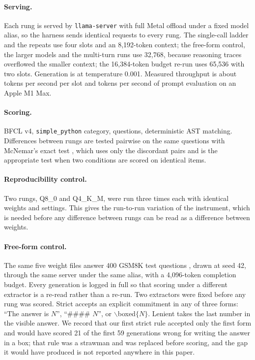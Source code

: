 \documentclass[11pt]{article}
\newcommand{\bfcl}{BFCL}
\begin{document}
\paragraph{Serving.} Each rung is served by \texttt{llama-server} with full Metal offload under a fixed model alias, so the harness sends identical requests to every rung. The single-call ladder and the repeats use four slots and an 8{,}192-token context; the free-form control, the larger models and the multi-turn runs use 32{,}768, because reasoning traces overflowed the smaller context; the 16{,}384-token budget re-run uses 65{,}536 with two slots. Generation is at temperature 0.001. Measured throughput is about \qtMacTg{} tokens per second per slot and \qtMacPp{} tokens per second of prompt evaluation on an Apple M1 Max.

\paragraph{Scoring.} \bfcl{} v4, \texttt{simple\_python} category, \qtN{} questions, deterministic AST matching. Differences between rungs are tested pairwise on the same \qtN{} questions with McNemar's exact test \citep{mcnemar1947}, which uses only the discordant pairs and is the appropriate test when two conditions are scored on identical items.

\paragraph{Reproducibility control.} Two rungs, Q8\_0 and Q4\_K\_M, were run three times each with identical weights and settings. This gives the run-to-run variation of the instrument, which is needed before any difference between rungs can be read as a difference between weights.

\paragraph{Free-form control.} The same five weight files answer 400 GSM8K test questions \citep{gsm8k2021}, drawn at seed 42, through the same server under the same alias, with a 4{,}096-token completion budget. Every generation is logged in full so that scoring under a different extractor is a re-read rather than a re-run. Two extractors were fixed before any rung was scored. Strict accepts an explicit commitment in any of three forms: ``The answer is $N$'', ``\#\#\#\# $N$'', or $\backslash$boxed$\{N\}$. Lenient takes the last number in the visible answer. We record that our first strict rule accepted only the first form and would have scored 21 of the first 59 generations wrong for writing the answer in a box; that rule was a strawman and was replaced before scoring, and the gap it would have produced is not reported anywhere in this paper.
\end{document}
